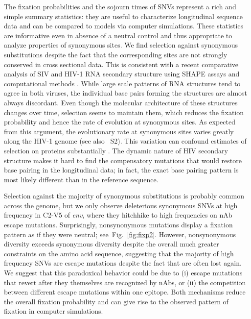 \documentclass[11pt]{article}
\newcommand{\FIG}[1]{Fig.~\ref{fig:#1}}
\newcommand{\env}{\textit{env}}
\newcommand{\shankaregion}{C2-V5}
\newcommand{\syndiv}{2}
\begin{document}
The fixation probabilities and the sojourn times of SNVs represent a rich and simple
summary statistics: they are useful to characterize longitudinal sequence data and
can be compared to models via computer simulations. These statistics are informative
even in absence of a neutral control and thus appropriate to analyze
properties of synonymous sites. 
We find selection against synonymous substitutions despite the
fact that the corresponding sites are not strongly conserved in
cross sectional data. This is consistent with a recent comparative
analysis of SIV and HIV-1 RNA secondary structure using SHAPE assays and
computational methods \citep{pollom_comparison_2013}. While large scale
patterns of RNA structures tend to agree in both viruses, the individual
base pairs forming the structures are almost always
discordant. Even though the molecular architecture of these structures
changes over time, selection seems to maintain them, which reduces the
fixation probability and hence the rate of evolution at synonymous
sites. As expected from this argument, the evolutionary rate
at synonymous sites varies greatly along the HIV-1 genome
\citep{mayrose_towards_2007} (see also \figurename~S\syndiv). This variation can confound estimates of
selection on proteins substantially \citep{ngandu_extensive_2008}. 
The dynamic nature of HIV secondary structure makes it hard to find the 
compensatory mutations that would restore base pairing in the
longitudinal data; in fact, the exact base pairing pattern is
most likely different than in the reference sequence.

Selection against the majority of synonymous substitutions is probably
common across the genome, but we only observe deleterious synonymous SNVs
at high frequency in \shankaregion{} of \env{}, where they hitchhike to
high frequencies on nAb escape mutations. Surprisingly, nonsynonymous
mutations display a fixation pattern as if they were neutral;
see~\FIG{fixp2}. However, nonsynonymous diversity exceeds
synonymous diversity despite the overall much greater constraints on the
amino acid sequence, suggesting that the majority of high frequency SNVs
are escape mutations despite the fact that are often lost again. We suggest that this
paradoxical behavior could be due to (i) escape
mutations that revert after they themselves are recognized by nAbs, or (ii)
the competition between different escape mutations within one epitope. 
Both mechanisms reduce the overall fixation probability and can
give rise to the observed pattern of fixation in computer simulations.
\end{document}
